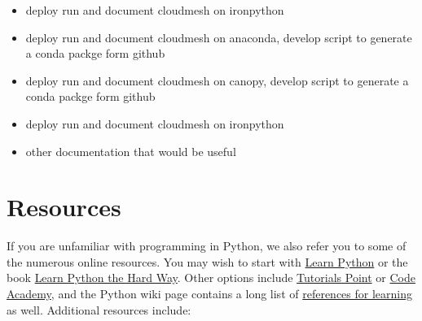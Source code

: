 \begin{itemize}

\item
  deploy run and document cloudmesh on ironpython
\item
  deploy run and document cloudmesh on anaconda, develop script to
  generate a conda packge form github
\item
  deploy run and document cloudmesh on canopy, develop script to
  generate a conda packge form github
\item
  deploy run and document cloudmesh on ironpython
\item
  other documentation that would be useful
\end{itemize}


\section{Resources}\label{resources}

If you are unfamiliar with programming in Python, we also refer you to
some of the numerous online resources. You may wish to start with
\href{https://www.learnpython.org}{Learn Python} or the book
\href{http://learnpythonthehardway.org/book/}{Learn Python the Hard
Way}. Other options include
\href{http://www.tutorialspoint.com/python/}{Tutorials Point} or
\href{http://www.codecademy.com/en/tracks/python}{Code Academy}, and the
Python wiki page contains a long list of
\href{https://wiki.python.org/moin/BeginnersGuide/Programmers}{references
for learning} as well. Additional resources include:

